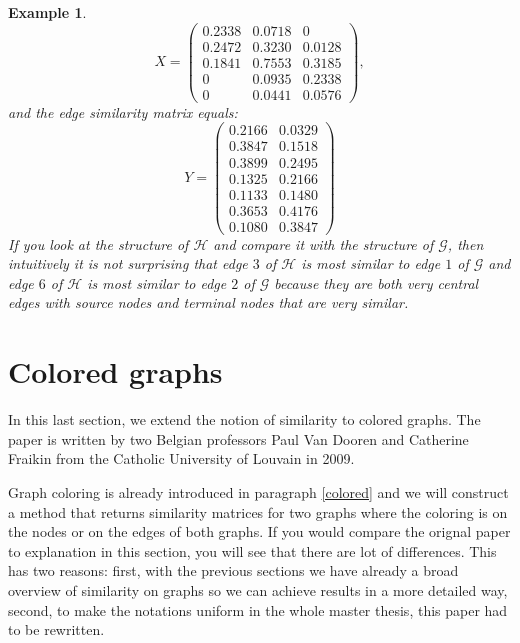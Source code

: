\documentclass[a4paper,11pt]{report}
\newtheorem{example}[theorem]{Example}
\newcommand{\graf}{\mathscr{G}}
\newcommand{\grafeen}{\mathscr{H}}
\begin{document}
\begin{example}
$$X = \begin{pmatrix}
0.2338  &  0.0718  &       0\\
0.2472   & 0.3230  &  0.0128\\
0.1841   &  0.7553 &   0.3185\\
0  &  0.0935  &  0.2338\\
0   & 0.0441 &   0.0576
\end{pmatrix},$$
 and the edge similarity matrix equals:
 $$ Y = \begin{pmatrix}
0.2166 & 0.0329\\
0.3847 & 0.1518\\
0.3899 & 0.2495\\
0.1325 & 0.2166\\
0.1133 & 0.1480\\
0.3653 & 0.4176\\
0.1080 & 0.3847
\end{pmatrix}$$
If you look at the structure of $\grafeen$ and compare it with the structure of $\graf$, then 
intuitively it is not surprising that edge $3$ of $\grafeen$ is most similar to edge $1$ of 
$\graf$ and edge $6$ of $\grafeen$ is most similar to edge $2$ of $\graf$ because they are both very
central edges with source nodes and terminal nodes that are very similar.
 \end{example}
 


\section{Colored graphs}
In this last section, we extend the notion of similarity to colored graphs. The 
paper \cite{vandoren} is written by two Belgian professors Paul Van Dooren and 
Catherine Fraikin from the Catholic University of 
Louvain in 2009.

Graph coloring is already introduced in paragraph \ref{colored} and we will 
construct a method that returns similarity matrices for two graphs where the coloring is on the nodes or 
on the edges of both graphs. If you would compare the orignal paper to 
explanation in this section, you will see that there are lot of differences. 
This has two reasons: first, with the previous sections we have already a broad overview of 
similarity on graphs so we can achieve results in a more detailed way, second, to make 
the notations uniform in the whole master thesis, this paper had to be 
rewritten.
\end{document}
